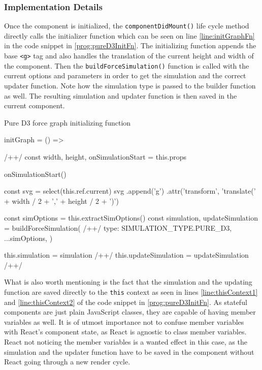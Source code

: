 \subsubsection{Implementation Details}

Once the component is initialized, the \texttt{componentDidMount()} life cycle method directly calls the initializer function which can be seen on line \ref{line:initGraphFn} in the code snippet in \ref{prog:pureD3InitFn}. The initializing function appends the base \texttt{<g>} tag and also handles the translation of the current height and width of the component. Then the \texttt{buildForceSimulation()} function is called with the current options and parameters in order to get the simulation and the correct updater function. Note how the simulation type is passed to the builder function as well. The resulting simulation and updater function is then saved in the current component.

\begin{program}
\caption{Pure D3 force graph initializing function}
\label{prog:pureD3InitFn}
\begin{JsCode}
initGraph = () => { /+\label{line:initGraphFn}+/
  const { width, height, onSimulationStart } = this.props

  onSimulationStart()

  const svg = select(this.ref.current)
  svg
    .append('g')
    .attr('transform', 'translate(' + width / 2 + ',' + height / 2 + ')')

  const simOptions = this.extractSimOptions()
  const { simulation, updateSimulation } = buildForceSimulation({ /+\label{line:buildForceSimulation}+/
    type: SIMULATION_TYPE.PURE_D3,
    ...simOptions,
  })

  this.simulation = simulation /+\label{line:thisContext1}+/
  this.updateSimulation = updateSimulation /+\label{line:thisContext2}+/
}
\end{JsCode}
\end{program}

What is also worth mentioning is the fact that the simulation and the updating function are saved directly to the \texttt{this} context as seen in lines \ref{line:thisContext1} and \ref{line:thisContext2} of the code snippet in \ref{prog:pureD3InitFn}. As stateful components are just plain JavaScript classes, they are capable of having member variables as well. It is of utmost importance not to confuse member variables with React's component state, as React is agnostic to class member variables. React not noticing the member variables is a wanted effect in this case, as the simulation and the updater function have to be saved in the component without React going through a new render cycle. 

